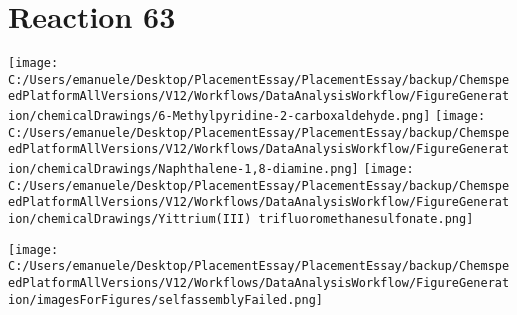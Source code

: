 \documentclass{article}%
\begin{document}
\section*{Reaction 63}%
%
\begin{scheme}[H]%
\begin{minipage}{0.5\textwidth}%
\texttt{[image: C:/Users/emanuele/Desktop/PlacementEssay/PlacementEssay/backup/ChemspeedPlatformAllVersions/V12/Workflows/DataAnalysisWorkflow/FigureGeneration/chemicalDrawings/6-Methylpyridine-2-carboxaldehyde.png]}%
\texttt{[image: C:/Users/emanuele/Desktop/PlacementEssay/PlacementEssay/backup/ChemspeedPlatformAllVersions/V12/Workflows/DataAnalysisWorkflow/FigureGeneration/chemicalDrawings/Naphthalene-1,8-diamine.png]}%
\texttt{[image: C:/Users/emanuele/Desktop/PlacementEssay/PlacementEssay/backup/ChemspeedPlatformAllVersions/V12/Workflows/DataAnalysisWorkflow/FigureGeneration/chemicalDrawings/Yittrium(III) trifluoromethanesulfonate.png]}%
\end{minipage}%
\begin{minipage}{0.5\textwidth}%
\begin{center}%
\texttt{[image: C:/Users/emanuele/Desktop/PlacementEssay/PlacementEssay/backup/ChemspeedPlatformAllVersions/V12/Workflows/DataAnalysisWorkflow/FigureGeneration/imagesForFigures/selfassemblyFailed.png]}%
\end{center}%
\end{minipage}%
\caption{Self-assembly of components 8, 21, with Yittrium(III) in a 3.0:1.5:1.0 molar ratio in CH$_3$CN at 60\textdegree C for 40h. These are the reagents (starting materials) for reaction 63.}%
\end{scheme}%
\end{document}
